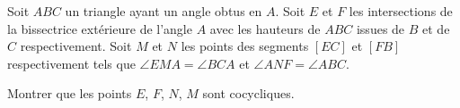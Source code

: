 Soit $ABC$ un triangle ayant un angle obtus en $A$. Soit $E$ et $F$ les intersections de la bissectrice extérieure de l'angle $A$ avec les hauteurs de $ABC$ issues de $B$ et de $C$ respectivement. Soit $M$ et $N$ les points des segments $[EC]$ et $[FB]$ respectivement tels que $\angle EMA = \angle BCA$ et $\angle ANF = \angle ABC$.

Montrer que les points $E$, $F$, $N$, $M$ sont cocycliques.
